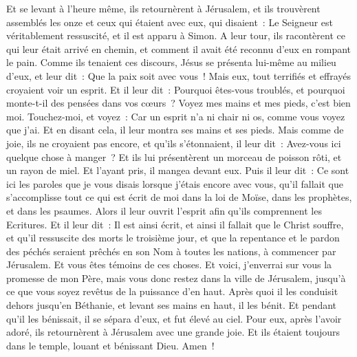 \begin{multicols}{2}
Et se levant à l'heure même, ils retournèrent à Jérusalem, et ils trouvèrent assemblés les onze et ceux qui étaient avec eux,
qui disaient~: Le Seigneur est véritablement ressuscité, et il est apparu à Simon.
A leur tour, ils racontèrent ce qui leur était arrivé en chemin, et comment il avait été reconnu d'eux en rompant le pain.
Comme ils tenaient ces discours, Jésus se présenta lui-même au milieu d'eux, et leur dit~: Que la paix soit avec vous~!
Mais eux, tout terrifiés et effrayés croyaient voir un esprit.
Et il leur dit~: Pourquoi êtes-vous troublés, et pourquoi monte-t-il des pensées dans vos cœurs~?
Voyez mes mains et mes pieds, c'est bien moi. Touchez-moi, et voyez~: Car un esprit n'a ni chair ni os, comme vous voyez que j'ai.
Et en disant cela, il leur montra ses mains et ses pieds.
Mais comme de joie, ils ne croyaient pas encore, et qu'ils s'étonnaient, il leur dit~: Avez-vous ici quelque chose à manger~?
Et ils lui présentèrent un morceau de poisson rôti, et un rayon de miel.
Et l'ayant pris, il mangea devant eux.
Puis il leur dit~: Ce sont ici les paroles que je vous disais lorsque j'étais encore avec vous, qu'il fallait que s'accomplisse tout ce qui est écrit de moi dans la loi de Moïse, dans les prophètes, et dans les psaumes.
Alors il leur ouvrit l'esprit afin qu'ils comprennent les Ecritures.
Et il leur dit~: Il est ainsi écrit, et ainsi il fallait que le Christ souffre, et qu'il ressuscite des morts le troisième jour,
et que la repentance et le pardon des péchés seraient prêchés en son Nom à toutes les nations, à commencer par Jérusalem.
Et vous êtes témoins de ces choses. 
Et voici, j'enverrai sur vous la promesse de mon Père, mais vous donc restez dans la ville de Jérusalem, jusqu'à ce que vous soyez revêtus de la puissance d'en haut.
Après quoi il les conduisit dehors jusqu'en Béthanie, et levant ses mains en haut, il les bénit.
Et pendant qu'il les bénissait, il se sépara d'eux, et fut élevé au ciel.
Pour eux, après l'avoir adoré, ils retournèrent à Jérusalem avec une grande joie.
Et ils étaient toujours dans le temple, louant et bénissant Dieu. Amen~!
\PPE{}
\end{multicols}

